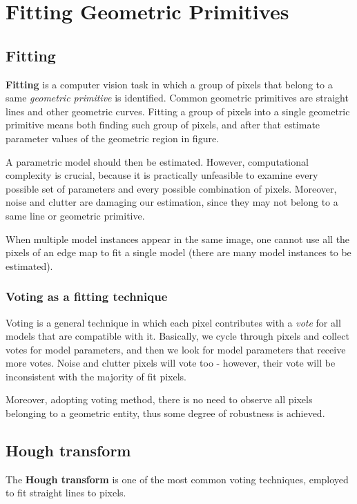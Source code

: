 \documentclass[10pt]{report}
\begin{document}
\chapter{Fitting Geometric Primitives}
\label{fitting-geometric-primitives}
\section{Fitting}
\label{fitting}
\textbf{Fitting} is a computer vision task in which a group of pixels that
belong to a same \emph{geometric primitive} is identified. Common geometric
primitives are straight lines and other geometric curves. Fitting a
group of pixels into a single geometric primitive means both finding
such group of pixels, and after that estimate parameter values of the
geometric region in figure.

A parametric model should then be estimated. However, computational
complexity is crucial, because it is practically unfeasible to examine
every possible set of parameters and every possible combination of
pixels. Moreover, noise and clutter are damaging our estimation, since
they may not belong to a same line or geometric primitive.

When multiple model instances appear in the same image, one cannot use
all the pixels of an edge map to fit a single model (there are many
model instances to be estimated).

\subsection{Voting as a fitting technique}
\label{voting-as-a-fitting-technique}
Voting is a general technique in which each pixel contributes with a
\emph{vote} for all models that are compatible with it. Basically, we cycle
through pixels and collect votes for model parameters, and then we look
for model parameters that receive more votes. Noise and clutter pixels
will vote too - however, their vote will be inconsistent with the
majority of fit pixels.

Moreover, adopting voting method, there is no need to observe all pixels
belonging to a geometric entity, thus some degree of robustness is
achieved.

\section{Hough transform}
\label{hough-transform}
The \textbf{Hough transform} is one of the most common voting techniques,
employed to fit straight lines to pixels.
\end{document}
